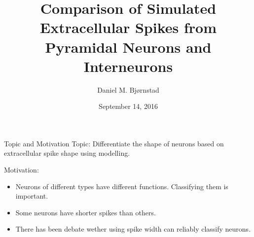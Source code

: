 \documentclass[aspectratio=169]{beamer}
\title[Short title] %
{
    Comparison of Simulated Extracellular Spikes from Pyramidal Neurons and Interneurons
}
\author %
{Daniel M. Bj\o rnstad}
\date{September 14, 2016}
\institute
{
    Master Thesis Presentation
}
\begin{document}
\begin{frame}
  \titlepage
\end{frame}






%   
%   
%

\begin{frame}{Topic and Motivation}
    Topic: Differentiate the shape of neurons based on extracellular spike shape using modelling.
    \newline

    Motivation: 
    \begin{itemize}
        \item Neurons of different types have different functions. Classifying them is important.
        \item Some neurons have shorter spikes than others. 
        \item There has been debate wether using spike width can reliably classify neurons. 
    \end{itemize}
\end{frame}
\end{document}
